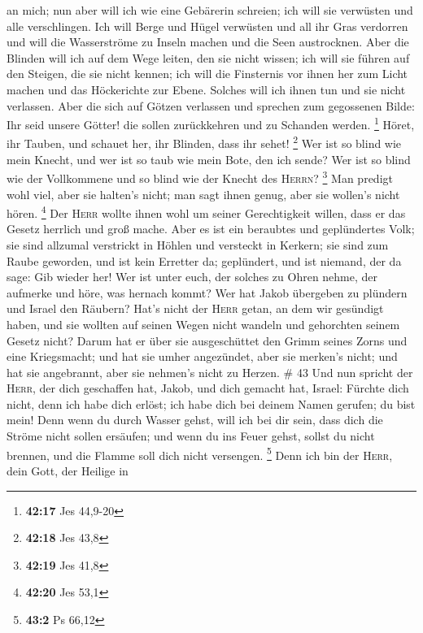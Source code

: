 an mich; nun aber will ich wie eine Gebärerin schreien; ich will sie
verwüsten und alle verschlingen.  Ich will Berge und
Hügel verwüsten und all ihr Gras verdorren und will die Wasserströme zu
Inseln machen und die Seen austrocknen.  Aber die Blinden
will ich auf dem Wege leiten, den sie nicht wissen; ich will sie führen
auf den Steigen, die sie nicht kennen; ich will die Finsternis vor ihnen
her zum Licht machen und das Höckerichte zur Ebene. Solches will ich
ihnen tun und sie nicht verlassen.  Aber die sich auf
Götzen verlassen und sprechen zum gegossenen Bilde: Ihr seid unsere
Götter! die sollen zurückkehren und zu Schanden werden. \footnote{\textbf{42:17}
  Jes 44,9-20}  Höret, ihr Tauben, und schauet her, ihr
Blinden, dass ihr sehet! \footnote{\textbf{42:18} Jes 43,8}
 Wer ist so blind wie mein Knecht, und wer ist so taub
wie mein Bote, den ich sende? Wer ist so blind wie der Vollkommene und
so blind wie der Knecht des \textsc{Herrn}? \footnote{\textbf{42:19} Jes
  41,8}  Man predigt wohl viel, aber sie halten's nicht;
man sagt ihnen genug, aber sie wollen's nicht hören. \footnote{\textbf{42:20}
  Jes 53,1}  Der \textsc{Herr} wollte ihnen wohl um
seiner Gerechtigkeit willen, dass er das Gesetz herrlich und groß mache.
 Aber es ist ein beraubtes und geplündertes Volk; sie
sind allzumal verstrickt in Höhlen und versteckt in Kerkern; sie sind
zum Raube geworden, und ist kein Erretter da; geplündert, und ist
niemand, der da sage: Gib wieder her!  Wer ist unter
euch, der solches zu Ohren nehme, der aufmerke und höre, was hernach
kommt?  Wer hat Jakob übergeben zu plündern und Israel
den Räubern? Hat's nicht der \textsc{Herr} getan, an dem wir gesündigt
haben, und sie wollten auf seinen Wegen nicht wandeln und gehorchten
seinem Gesetz nicht?  Darum hat er über sie ausgeschüttet
den Grimm seines Zorns und eine Kriegsmacht; und hat sie umher
angezündet, aber sie merken's nicht; und hat sie angebrannt, aber sie
nehmen's nicht zu Herzen. \# 43  Und nun spricht der
\textsc{Herr}, der dich geschaffen hat, Jakob, und dich gemacht hat,
Israel: Fürchte dich nicht, denn ich habe dich erlöst; ich habe dich bei
deinem Namen gerufen; du bist mein!  Denn wenn du durch
Wasser gehst, will ich bei dir sein, dass dich die Ströme nicht sollen
ersäufen; und wenn du ins Feuer gehst, sollst du nicht brennen, und die
Flamme soll dich nicht versengen. \footnote{\textbf{43:2} Ps 66,12}
 Denn ich bin der \textsc{Herr}, dein Gott, der Heilige in
